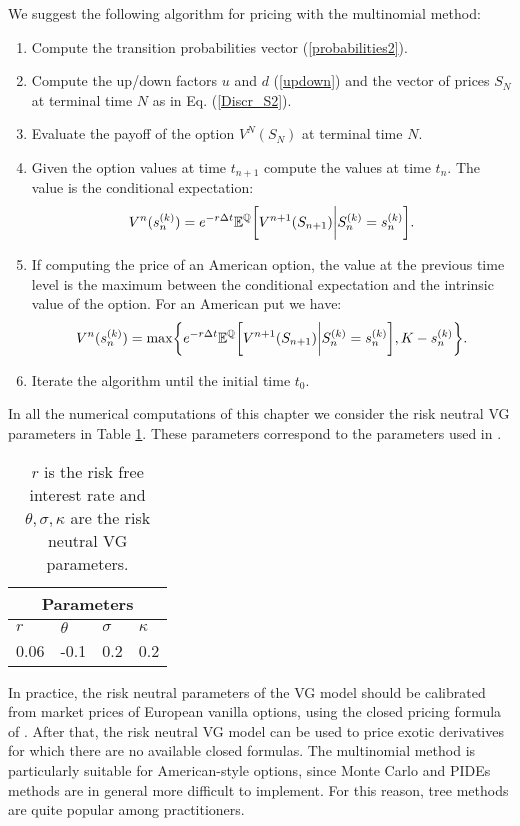 We suggest the following algorithm for pricing with the multinomial method:
\begin{enumerate}
 \item Compute the transition probabilities vector (\ref{probabilities2}). 
 \item Compute the up/down factors $u$ and $d$ (\ref{updown}) and the vector of prices $S_N$ at terminal time $N$ as in Eq. (\ref{Discr_S2}).
 \item Evaluate the payoff of the option $V^N(S_N)$ at terminal time $N$.
 \item Given the option values at time $t_{n+1}$ compute the values at time $t_n$. The value is the conditional expectation:
 \begin{equation}
 V^n(s^{(k)}_n) = e^{-r\Delta t} \mathbb{E}^{\mathbb{Q}} \biggl[ V^{n+1}(S_{n+1}) \bigg| S^{(k)}_n = s^{(k)}_n \biggr]. 
\end{equation}
 \item If computing the price of an American option, the value at the previous time level is the maximum between the conditional expectation and
 the intrinsic value of the option. For an American put we have:
 \begin{equation}
 V^n(s^{(k)}_n) = \max \biggr \{ e^{-r\Delta t} \mathbb{E}^{\mathbb{Q}} \biggl[ V^{n+1}(S_{n+1}) \bigg| S^{(k)}_n = s^{(k)}_n \biggr] , K-s^{(k)}_n \biggr \}. 
\end{equation}	
 \item Iterate the algorithm until the initial time $t_0$. 
\end{enumerate}

In all the numerical computations of this chapter we consider the risk neutral VG parameters in Table \ref{sample-table}. These parameters correspond to the parameters used 
in \cite{Canta2}.

\begin{table}[!h]
\centering
{\begin{tabular}{llll}
\toprule
 \multicolumn{4}{c}{Parameters} \\
\midrule
$r$ & $\theta$ & $\sigma$ & $\kappa$ \\ 
0.06 & -0.1 & 0.2 & 0.2 \\
\bottomrule
\end{tabular}}
\caption{$r$ is the risk free interest rate and $\theta, \sigma, \kappa$ are the risk neutral VG parameters.}
\label{sample-table}
\end{table}

\begin{Remark}
In practice, the risk neutral parameters of the VG model should be calibrated from market prices of European vanilla options, using the closed pricing formula of \cite{MCC98}.
After that, the risk neutral VG model can be used to price exotic derivatives for which there are no available closed formulas.
The multinomial method is particularly suitable for American-style options, since Monte Carlo and PIDEs methods are in general more difficult to implement. 
For this reason, tree methods are quite popular among practitioners. 
\end{Remark}







